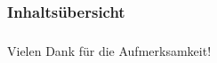 \documentclass[xetex,mathserif,serif]{beamer}
\date{\today}
\institute{Fakultät IMN - HTWK Leipzig}
\author{Oliver Friedrich}
\title{}
\subtitle{}
\begin{document}
\begin{frame}
\centering
\titlepage
\end{frame}

\begin{frame}
    \frametitle{Inhaltsübersicht}
    \tableofcontents
\end{frame}

\begin{frame}
    \frametitle{}
\end{frame}

\begin{frame}
    \centering
    \huge Vielen Dank für die Aufmerksamkeit!\\
\end{frame}
\end{document}
